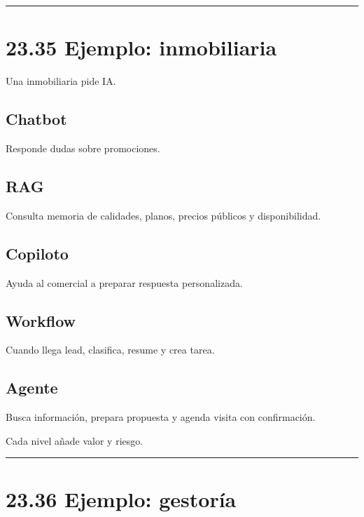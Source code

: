 \begin{center}\rule{0.5\linewidth}{0.5pt}\end{center}

\section{23.35 Ejemplo: inmobiliaria}\label{ejemplo-inmobiliaria}

Una inmobiliaria pide IA.

\subsection{Chatbot}\label{chatbot-6}

Responde dudas sobre promociones.

\subsection{RAG}\label{rag-3}

Consulta memoria de calidades, planos, precios públicos y
disponibilidad.

\subsection{Copiloto}\label{copiloto-5}

Ayuda al comercial a preparar respuesta personalizada.

\subsection{Workflow}\label{workflow-5}

Cuando llega lead, clasifica, resume y crea tarea.

\subsection{Agente}\label{agente-6}

Busca información, prepara propuesta y agenda visita con confirmación.

Cada nivel añade valor y riesgo.

\begin{center}\rule{0.5\linewidth}{0.5pt}\end{center}

\section{23.36 Ejemplo: gestoría}\label{ejemplo-gestoruxeda}

